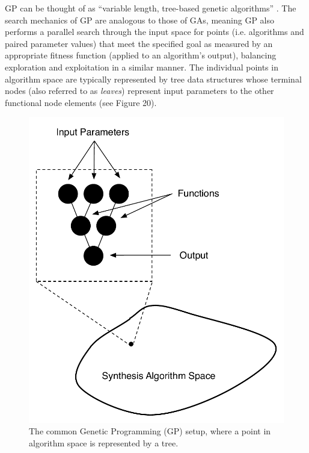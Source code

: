 \documentclass[12pt]{report} 	%
\numberwithin{figure}{chapter}
\numberwithin{table}{chapter}
\numberwithin{equation}{chapter}
\begin{document}
\begin{flushleft}
GP can be thought of as ``variable length, tree-based genetic algorithms'' \cite[p. 29]{Teller:1998ly}. The search mechanics of GP are analogous to those of GAs, meaning GP also performs a parallel search through the input space for points (i.e. algorithms and paired parameter values) that meet the specified goal as measured by an appropriate fitness function (applied to an algorithm's output), balancing exploration and exploitation in a similar manner. The individual points in algorithm space are typically represented by tree data structures whose terminal nodes (also referred to as \textit{leaves}) represent input parameters to the other functional node elements (see Figure 20). 
\begin{figure}[h!]
\begin{center}
\includegraphics[scale=0.70]{GraphAsPoint}
\caption[The genetic programming paradigm]{The common Genetic Programming (GP) setup, where a point in algorithm space is represented by a tree.}
\end{center}
\end{figure}

\end{flushleft}
\end{document}
